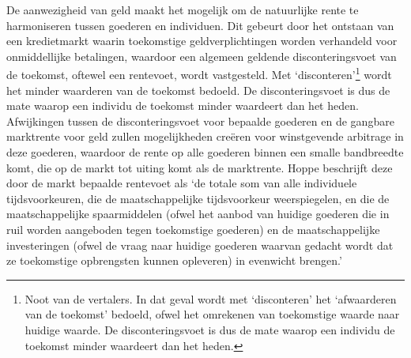 De aanwezigheid van geld maakt het mogelijk om de natuurlijke rente te harmoniseren tussen goederen en individuen. Dit gebeurt door het ontstaan van een kredietmarkt waarin toekomstige geldverplichtingen worden verhandeld voor onmiddellijke betalingen, waardoor een algemeen geldende disconteringsvoet van de toekomst, oftewel een rentevoet, wordt vastgesteld. Met `disconteren'\footnote{Noot van de vertalers. In dat geval wordt met `disconteren' het `afwaarderen van de toekomst' bedoeld, ofwel het omrekenen van toekomstige waarde naar huidige waarde. De disconteringsvoet is dus de mate waarop een individu de toekomst minder waardeert dan het heden.} wordt het minder waarderen van de toekomst bedoeld. De disconteringsvoet is dus de mate waarop een individu de toekomst minder waardeert dan het heden. Afwijkingen tussen de disconteringsvoet voor bepaalde goederen en de gangbare marktrente voor geld zullen mogelijkheden creëren voor winstgevende arbitrage in deze goederen, waardoor de rente op alle goederen binnen een smalle bandbreedte komt, die op de markt tot uiting komt als de marktrente. Hoppe beschrijft deze door de markt bepaalde rentevoet als `de totale som van alle individuele tijdsvoorkeuren, die de maatschappelijke tijdsvoorkeur weerspiegelen, en die de maatschappelijke spaarmiddelen (ofwel het aanbod van huidige goederen die in ruil worden aangeboden tegen toekomstige goederen) en de maatschappelijke investeringen (ofwel de vraag naar huidige goederen waarvan gedacht wordt dat ze toekomstige opbrengsten kunnen opleveren) in evenwicht brengen.'\autocite{159}

